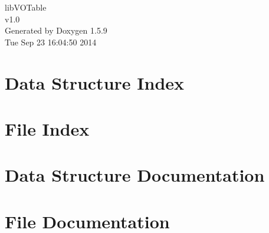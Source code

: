 \documentclass[letterpaper]{book}
\begin{document}
\hypersetup{pageanchor=false}
\begin{titlepage}
\vspace*{7cm}
\begin{center}
{\Large libVOTable \\[1ex]\large v1.0 }\\
\vspace*{1cm}
{\large Generated by Doxygen 1.5.9}\\
\vspace*{0.5cm}
{\small Tue Sep 23 16:04:50 2014}\\
\end{center}
\end{titlepage}
\clearemptydoublepage
{}
\tableofcontents
\clearemptydoublepage
{}
\hypersetup{pageanchor=true}
\chapter{Data Structure Index}

\chapter{File Index}

\chapter{Data Structure Documentation}





\chapter{File Documentation}










\printindex
\end{document}
